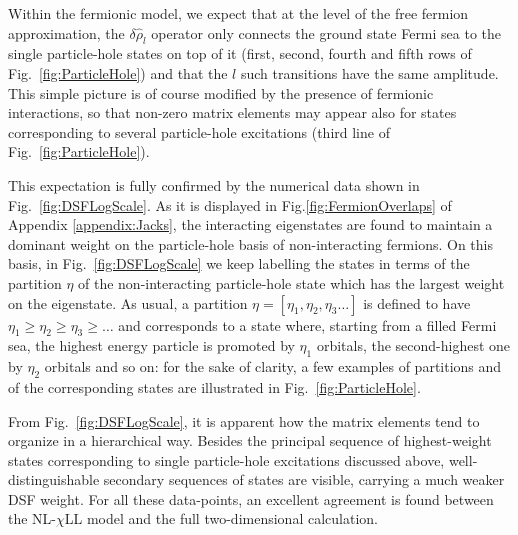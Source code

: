 \documentclass[twocolumn,pra,superscriptaddress,noshowpacs]{revtex4}
\newcommand{\addition}[1]{\textcolor{blue}{#1}}
\newcommand{\nlchill}{NL-$\chi$LL }
\begin{document}
Within the fermionic model, we expect that at the level of the free fermion approximation, the $\delta\hat\rho_l$ operator only connects the ground state Fermi sea to the single particle-hole states on top of it (first, second, fourth and fifth rows of Fig.~\ref{fig:ParticleHole}) and that the $l$ such transitions have the same amplitude.
This simple picture is of course modified by the presence of fermionic interactions, so that non-zero matrix elements may appear also for states corresponding to several particle-hole excitations (third line of Fig.~\ref{fig:ParticleHole}). 

This expectation is fully confirmed by the numerical data shown in Fig.~\ref{fig:DSFLogScale}. 
As it is displayed in Fig.\ref{fig:FermionOverlaps} of Appendix \ref{appendix:Jacks}, the interacting eigenstates are found to maintain a dominant weight on the particle-hole basis of non-interacting fermions. On this basis, in Fig.~\ref{fig:DSFLogScale} we keep labelling the states in terms of the partition $\eta$ of the non-interacting particle-hole state which has the largest weight on the eigenstate. As usual, a partition $\eta=[\eta_1,\eta_2,\eta_3\ldots]$ is defined to have $\eta_1\geq\eta_2\geq\eta_3\geq\ldots$ and corresponds to a state where, starting from a filled Fermi sea, the highest energy particle is promoted by $\eta_1$ orbitals, the second-highest one by $\eta_2$ orbitals and so on: for the sake of clarity, a few examples of partitions and of the corresponding states are illustrated in Fig.~\ref{fig:ParticleHole}.

 
From Fig.~\ref{fig:DSFLogScale}, it is apparent how the matrix elements %
tend to organize in a hierarchical way. Besides the principal sequence of highest-weight states corresponding to single particle-hole excitations discussed above, 
well-distinguishable secondary sequences of states are visible, carrying a much weaker DSF weight. For all these data-points, an excellent agreement is found between the \nlchill model and the full two-dimensional calculation. 
\end{document}
